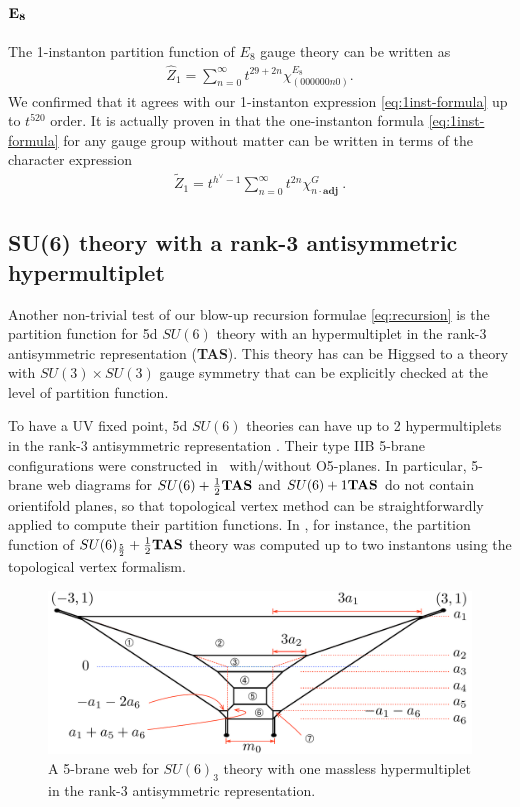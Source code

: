 \documentclass[letterpaper, 11pt]{article}
\begin{document}
{\paragraph{$\bf E_8$}

The 1-instanton partition function of $E_8$ gauge theory can be written as 
\begin{align}
    \label{eq:E8}
  \hat{Z}_1=\sum_{n=0}^{\infty}t^{29+2n}\chi^{E_8}_{(000000n0)}.
\end{align}
We confirmed that it agrees with our 1-instanton expression \eqref{eq:1inst-formula} up to $t^{520}$ order. 
It is actually proven in \cite{Keller:2011ek, Keller:2012da} that the one-instanton formula \eqref{eq:1inst-formula} for any gauge group without matter can be written in terms of the character expression \cite{VinbergPopov, Garfinkle, Benvenuti:2010pq}
\begin{align}
 \tilde{Z}_1 = t^{h^\vee - 1} \sum_{n=0}^\infty t^{2n} \chi^G_{n \cdot \textbf{adj}} \ . 
\end{align}


\subsection{SU(6) theory with a rank-3 antisymmetric hypermultiplet}
\label{subsec:rank3}
Another non-trivial test of our blow-up recursion formulae \eqref{eq:recursion}  is the partition function for 5d $SU(6)$ theory with an hypermultiplet in the rank-3 antisymmetric representation ({\bf TAS}). This theory has can be Higgsed to a theory with $SU(3)\times SU(3)$ gauge symmetry that can be explicitly checked at the level of partition function.

To have a UV fixed point, 5d $SU(6)$ theories can have up to 2 hypermultiplets in the rank-3 antisymmetric representation \cite{Jefferson:2017ahm}. Their type IIB 5-brane configurations were constructed in~\cite{Hayashi:2019yxj} with/without O5-planes. In particular, 5-brane web diagrams for $SU(6)+\frac12{\bf TAS}$ and $SU(6)+1{\bf TAS}$ do not contain orientifold planes, so that topological vertex method \cite{Aganagic:2003db, Iqbal:2007ii} can be straightforwardly applied to compute their partition functions. In \cite{Hayashi:2019yxj},  for instance, the partition function of $SU(6)_\frac52 + \frac12{\bf TAS}$ theory was computed up to two instantons using the topological vertex formalism.
\begin{figure}[t]
\centering
\includegraphics[width=12cm]{SU6-monopole.pdf}
\caption{A 5-brane web for $SU(6)_3$ theory with one massless hypermultiplet in the rank-3 antisymmetric representation.}
\label{fig:SU6-monopole}
\end{figure}

}
\end{document}
